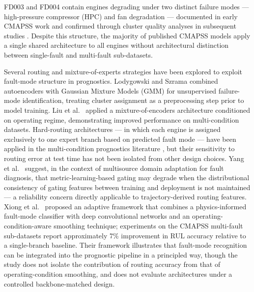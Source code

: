 \documentclass[preprint,10pt]{elsarticle}
\begin{document}
FD003 and FD004 contain engines degrading under two distinct failure modes --- high-pressure compressor (HPC) and fan degradation --- documented in early CMAPSS work \cite{ref07} and confirmed through cluster quality analyses in subsequent studies \cite{ref35,ref36}. Despite this structure, the majority of published CMAPSS models apply a single shared architecture to all engines without architectural distinction between single-fault and multi-fault sub-datasets.

Several routing and mixture-of-experts strategies have been explored to exploit fault-mode structure in prognostics. Lodygowski and Szrama \cite{ref31} combined autoencoders with Gaussian Mixture Models (GMM) for unsupervised failure-mode identification, treating cluster assignment as a preprocessing step prior to model training. Liu et al.\ \cite{ref32} applied a mixture-of-encoders architecture conditioned on operating regime, demonstrating improved performance on multi-condition datasets. Hard-routing architectures --- in which each engine is assigned exclusively to one expert branch based on predicted fault mode --- have been applied in the multi-condition prognostics literature \cite{ref30}, but their sensitivity to routing error at test time has not been isolated from other design choices. Yang et al.\ \cite{ref44} suggest, in the context of multisource domain adaptation for fault diagnosis, that metric-learning-based gating may degrade when the distributional consistency of gating features between training and deployment is not maintained --- a reliability concern directly applicable to trajectory-derived routing features. Xiong et al.\ \cite{ref53} proposed an adaptive framework that combines a physics-informed fault-mode classifier with deep convolutional networks and an operating-condition-aware smoothing technique; experiments on the CMAPSS multi-fault sub-datasets report approximately 7\% improvement in RUL accuracy relative to a single-branch baseline. Their framework illustrates that fault-mode recognition can be integrated into the prognostic pipeline in a principled way, though the study does not isolate the contribution of routing accuracy from that of operating-condition smoothing, and does not evaluate architectures under a controlled backbone-matched design.
\end{document}

